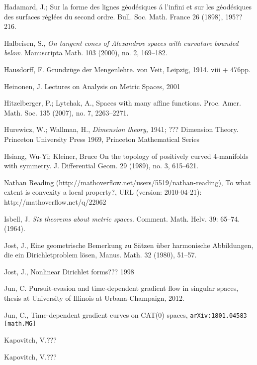 \begin{thebibliography}{52}
 Hadamard, J.;
Sur la forme des lignes g\'eod\'esiques \'a l'infini et sur les g\'eod\'esiques des surfaces r\'egl\'ees du second ordre.
Bull. Soc. Math. France 26 (1898), 195??216.


 Halbeisen, S., \textit{On tangent cones of Alexandrov spaces with curvature
bounded below.}  Manuscripta Math.  103  (2000),  no. 2, 169--182.

  Hausdorff, F. Grundz\"uge der Mengenlehre. von Veit, Leipzig, 1914. viii + 476pp.

Heinonen, J.
Lectures on Analysis on Metric Spaces,
2001


Hitzelberger, P.; Lytchak, A.,
Spaces with many affine functions. 
Proc. Amer. Math. Soc. 135 (2007), no. 7, 2263--2271.


 Hurewicz, W.; Wallman, H., \textit{Dimension theory,} 1941;
???  Dimension Theory. Princeton University Press 1969,
       Princeton Mathematical Series
       
Hsiang, Wu-Yi; Kleiner, Bruce
On the topology of positively curved 4-manifolds with symmetry.
J. Differential Geom. 29 (1989), no. 3, 615--621. 

Nathan Reading (http://mathoverflow.net/users/5519/nathan-reading), To what extent is convexity a local property?, URL (version: 2010-04-21): http://mathoverflow.net/q/22062

 Isbell, J. \textit{Six theorems about metric spaces}. Comment. Math. Helv. 39: 65--74.(1964).



 Jost, J.,
Eine geometrische Bemerkung zu S\"atzen \"uber
harmonische Abbildungen, die ein Dirichletproblem l\"osen,
Manus. Math. 32  (1980),  51--57.

 Jost, J., Nonlinear Dirichlet forms??? 1998

 Jun, C. Pursuit-evasion and time-dependent gradient flow in singular spaces,
thesis at University of Illinois at Urbana-Champaign, 2012.

 Jun, C., Time-dependent gradient curves on CAT(0) spaces, \texttt{arXiv:1801.04583 [math.MG]}

Kapovitch, V.???

Kapovitch, V.???


\end{thebibliography}
